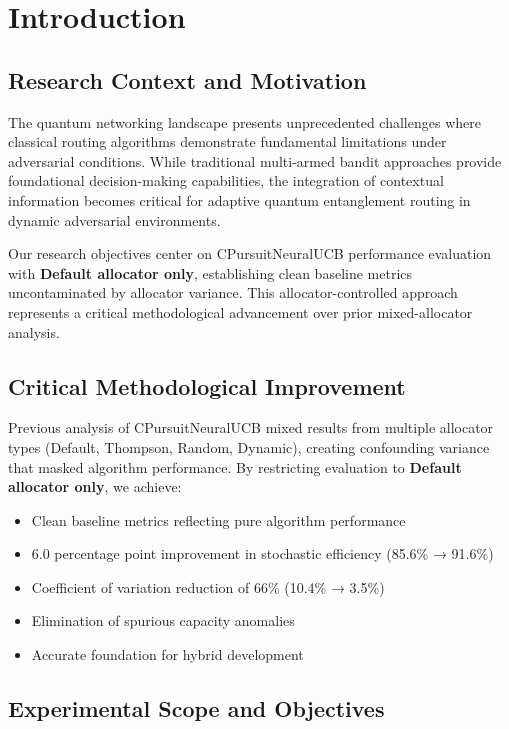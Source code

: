 \documentclass[12pt,a4paper]{article}
\begin{document}
\newpage
\section{Introduction}

\subsection{Research Context and Motivation}

The quantum networking landscape presents unprecedented challenges where classical routing algorithms demonstrate fundamental limitations under adversarial conditions. While traditional multi-armed bandit approaches provide foundational decision-making capabilities, the integration of contextual information becomes critical for adaptive quantum entanglement routing in dynamic adversarial environments.

Our research objectives center on CPursuitNeuralUCB performance evaluation with \textbf{Default allocator only}, establishing clean baseline metrics uncontaminated by allocator variance. This allocator-controlled approach represents a critical methodological advancement over prior mixed-allocator analysis.

\subsection{Critical Methodological Improvement}

Previous analysis of CPursuitNeuralUCB mixed results from multiple allocator types (Default, Thompson, Random, Dynamic), creating confounding variance that masked algorithm performance. By restricting evaluation to \textbf{Default allocator only}, we achieve:

\begin{itemize}
\item Clean baseline metrics reflecting pure algorithm performance
\item 6.0 percentage point improvement in stochastic efficiency (85.6\% → 91.6\%)
\item Coefficient of variation reduction of 66\% (10.4\% → 3.5\%)
\item Elimination of spurious capacity anomalies
\item Accurate foundation for hybrid development
\end{itemize}

\subsection{Experimental Scope and Objectives}
\end{document}
